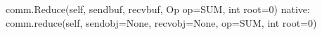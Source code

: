 comm.Reduce(self, sendbuf, recvbuf, Op op=SUM, int root=0)
native:
comm.reduce(self, sendobj=None, recvobj=None, op=SUM, int root=0)
